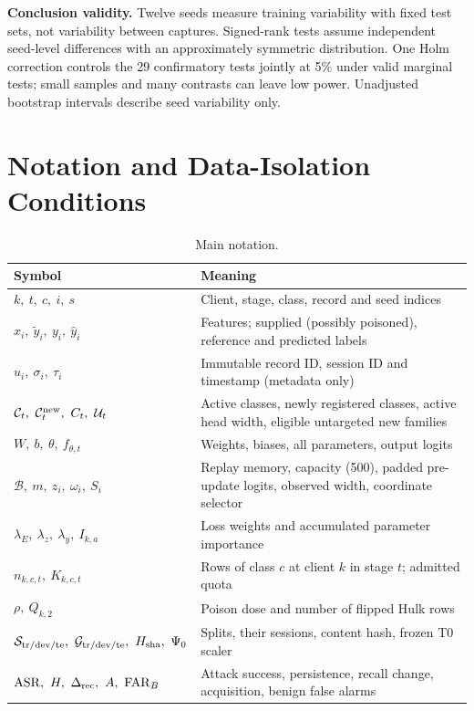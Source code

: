 \documentclass[10pt,a4paper]{article}
\begin{document}
\textbf{Conclusion validity.} Twelve seeds measure training variability with fixed test sets, not variability between captures. Signed-rank tests assume independent seed-level differences with an approximately symmetric distribution. One Holm correction controls the 29 confirmatory tests jointly at 5\% under valid marginal tests; small samples and many contrasts can leave low power. Unadjusted bootstrap intervals describe seed variability only.

\appendix
\section{Notation and Data-Isolation Conditions}
\label{app:notation}
\begin{table}[H]
\centering\footnotesize
\caption{Main notation.}
\label{tab:notation}
\begin{tabularx}{\linewidth}{L{4.6cm}Y}
\toprule
Symbol & Meaning\\
\midrule
$k,\ t,\ c,\ i,\ s$ & Client, stage, class, record and seed indices\\
$x_i,\ \widetilde y_i,\ y_i,\ \widehat y_i$ & Features; supplied (possibly poisoned), reference and predicted labels\\
$u_i,\ \sigma_i,\ \tau_i$ & Immutable record ID, session ID and timestamp (metadata only)\\
$\mathcal C_t,\ \mathcal C_t^{\rm new},\ C_t,\ \mathcal U_t$ & Active classes, newly registered classes, active head width, eligible untargeted new families\\
$W,\ b,\ \theta,\ f_{\theta,t}$ & Weights, biases, all parameters, output logits\\
$\mathcal B,\ m,\ z_i,\ \omega_i,\ S_i$ & Replay memory, capacity (500), padded pre-update logits, observed width, coordinate selector\\
$\lambda_E,\ \lambda_z,\ \lambda_y,\ I_{k,a}$ & Loss weights and accumulated parameter importance\\
$n_{k,c,t},\ K_{k,c,t}$ & Rows of class $c$ at client $k$ in stage $t$; admitted quota\\
$\rho,\ Q_{k,2}$ & Poison dose and number of flipped Hulk rows\\
$\mathcal S_{\rm tr/dev/te},\ \mathcal G_{\rm tr/dev/te},\ H_{\rm sha},\ \Psi_0$ & Splits, their sessions, content hash, frozen T0 scaler\\
$\mathrm{ASR},\ H,\ \Delta_{\rm rec},\ A,\ \mathrm{FAR}_B$ & Attack success, persistence, recall change, acquisition, benign false alarms\\
\bottomrule
\end{tabularx}
\end{table}
\end{document}
